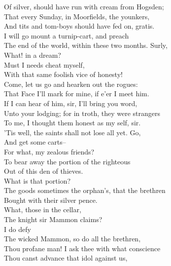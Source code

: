 \documentclass{memoir}
\begin{document}
\begin{drama*}
 Of silver, should have run with cream from Hogsden;\\
 That every Sunday, in Moorfields, the younkers,\\
 And tits and tom-boys should have fed on, gratis.\\
\mammonspeaks  I will go mount a turnip-cart, and preach\\
 The end of the world, within these two months. Surly,\\
 What! in a dream?\\
\surlyspeaks {} Must I needs cheat myself,\\
 With that same foolish vice of honesty!\\
 Come, let us go and hearken out the rogues:\\
 That Face I'll mark for mine, if e'er I meet him.\\
\facespeaks  If I can hear of him, sir, I'll bring you word,\\
 Unto your lodging; for in troth, they were strangers\\
 To me, I thought them honest as my self, sir.\\
\tribulationspeaks  'Tis well, the saints shall not lose all yet. Go,\\
 And get some carts--\\
\lovewitspeaks {} For what, my zealous friends?\\
\ananiasspeaks  To bear away the portion of the righteous\\
 Out of this den of thieves.\\
\lovewitspeaks {} What is that portion?\\
\ananiasspeaks  The goods sometimes the orphan's, that the brethren\\
 Bought with their silver pence.\\
\lovewitspeaks {} What, those in the cellar,\\
 The knight sir Mammon claims?\\
\ananiasspeaks {} I do defy\\
 The wicked Mammon, so do all the brethren,\\
 Thou profane man! I ask thee with what conscience\\
 Thou canst advance that idol against us,\\

\end{drama*}
\end{document}

